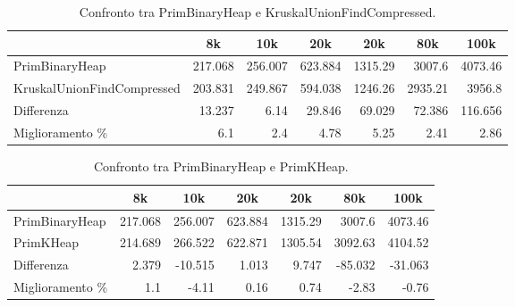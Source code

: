 \begin{table}[H]
\centering
    \begin{tabular}{|l|rrrrrr|}
    \hline
    &  \multicolumn{1}{c}{8k} & \multicolumn{1}{c}{10k} & \multicolumn{1}{c}{20k} & \multicolumn{1}{c}{20k} & \multicolumn{1}{c}{80k} &           \multicolumn{1}{c|}{100k} \\
    \hline
 PrimBinaryHeap             & 217.068 & 256.007 & 623.884 & 1315.29  & 3007.6   & 4073.46  \\
 KruskalUnionFindCompressed & 203.831 & 249.867 & 594.038 & 1246.26  & 2935.21  & 3956.8   \\ \hline
     Differenza             &  13.237 &   6.14  &  29.846 &   69.029 &   72.386 &  116.656 \\
     Miglioramento \%        &   6.1   &   2.4   &   4.78  &    5.25  &    2.41  &    2.86  \\
    \hline
    \end{tabular}
    \caption{Confronto tra PrimBinaryHeap e KruskalUnionFindCompressed.}
    \label{table:prim-binary-heap-vs-kruskal-union-find-compressed}
\end{table}

\begin{table}[H]
\centering
    \begin{tabular}{|l|rrrrrr|}
    \hline
    &  \multicolumn{1}{c}{8k} & \multicolumn{1}{c}{10k} & \multicolumn{1}{c}{20k} & \multicolumn{1}{c}{20k} & \multicolumn{1}{c}{80k} &           \multicolumn{1}{c|}{100k} \\
    \hline
PrimBinaryHeap    & 217.068 & 256.007 & 623.884 & 1315.29  & 3007.6   & 4073.46  \\
PrimKHeap         & 214.689 & 266.522 & 622.871 & 1305.54  & 3092.63  & 4104.52  \\ \hline
Differenza        &   2.379 & -10.515 &   1.013 &    9.747 &  -85.032 &  -31.063 \\
Miglioramento \%  &   1.1   &  -4.11  &   0.16  &    0.74  &   -2.83  &   -0.76  \\
    \hline
    \end{tabular}
    \caption{Confronto tra PrimBinaryHeap e PrimKHeap.}
    \label{table:prim-binary-heap-vs-prim-k-heap}
\end{table}


